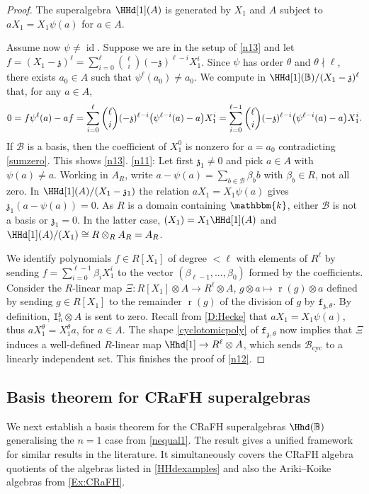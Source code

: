 \documentclass[a4paper,11pt]{amsart}
\newcommand\cB{\mathcal{B}}
\numberwithin{equation}{subsection}
\theoremstyle{definition}
\theoremstyle{theorem}
\theoremstyle{remark}
\newcommand\charge{{\mathfrak{z}}}
\newcommand\kapp{{\mathfrak{z}}}
\newcommand\Ic[1][n]{\mathtt{I}^\charge_{#1}}
\newcommand\fct{\mathtt{f}_{\charge,\theta}}
\newcommand\op{\operatorname}
\newcommand\kk{\mathbbm{k}}
\newcommand\RR{R}
\newcommand{\Bo}{\mathbb{B}}
\begin{document}
\begin{proof} The superalgebra $\HHd[1](A)$ is generated by $X_1$ and $A$ subject to $aX_1=X_1\psi(a)$ for $a\in A$.

Assume now $\psi\not=\op{id}$. Suppose we are in the setup of
\autoref{n13} and let $f=(X_1-\kapp)^\ell=\sum_{i=0}^{\ell}
  \binom{\ell}{i}(-\kapp)^{\ell-i}X_1^i$.  Since $\psi$ has order $\theta$ and $\theta\nmid\ell$, there exists $a_0\in A$ such
that $\psi^\ell(a_0)\neq a_0$. We compute in $\HHd[1](\Bo)/(X_1-\kapp)^\ell$ that, for any $a\in A$,
  \begin{equation}\label{sumzero}
  0=f\psi^\ell(a)-af
 =
 \sum_{i=0}^{\ell}
 \binom{\ell}{i}(-\kapp)^{\ell-i}
 \bigl(\psi^{\ell-i}(a)-a\bigr)X_1^i  \\
 =
 \sum_{i=0}^{\ell-1}
 \binom{\ell}{i}(-\kapp)^{\ell-i}
 \bigl(\psi^{\ell-i}(a)-a\bigr)X_1^i.
\end{equation}
If  $\cB$ is a basis, then the coefficient of $X_1^0$ is nonzero for  $a=a_0$ contradicting \autoref{sumzero}.
This shows  \autoref{n13}.
\autoref{n11}: Let first  $\kapp_1\neq0$ and pick $a\in A$ with $\psi(a)\neq a$. Working in $A_\RR$, write $a-\psi(a)=\sum_{b\in\cB}\beta_bb$ with $\beta_b\in\RR$, not all zero. In $\HHd[1](A)/(X_1-\kapp_1)$ the relation $aX_1=X_1\psi(a)$ gives $\kapp_1(a-\psi(a))=0$.  As $\RR$ is a domain containing $\kk$, either $\cB$ is not a basis or  $\kapp_1=0$. In the latter case,  $(X_1)=X_1\HHd[1](A)$ and $\HHd[1](A)/(X_1)\cong\RR\otimes_\RR A_\RR=A_\RR$.

 We identify polynomials $f\in R[X_1]$ of degree $<\ell$  with elements
of  $R^\ell$ by sending $f=\sum_{i=0}^{\ell-1}\beta_iX_1^i$ to the
vector $(\beta_{\ell-1},\ldots, \beta_0)$  formed by the coefficients.
Consider the $R$-linear map $\Xi\colon R[X_1]\otimes A\to
R^\ell\otimes A$, $g\otimes a\mapsto \op{r}(g)\otimes a$ defined by
sending  $g\in R[X_1]$ to the remainder $\op{r}(g)$ of the division of
$g$ by  $\fct$.  By definition,  $\Ic\otimes A$ is sent to zero.  Recall from
\autoref{D:Hecke} that $a X_1 =X_1
\psi(a)$, thus $a X_1^\theta =X_1^\theta a$, for $a\in A$. The shape \autoref{cyclotomicpoly} of $\fct$ now implies that $\Xi$ induces a well-defined $R$-linear map
 $\Hhd[1]\to R^\ell\otimes A$, which sends $\cB_{\op{cyc}}$ to a linearly independent set.  This finishes the proof of \autoref{n12}.
\end{proof}

 \subsection{Basis theorem for CRaFH superalgebras}
We next establish a basis theorem for the CRaFH superalgebras $\Hhd(\Bo)$
generalising the $n=1$ case from \autoref{nequal1}. The result gives  a unified framework for
similar results in the literature. It simultaneously covers the CRaFH
algebra quotients of the algebras listed in \autoref{HHdexamples} and also the Ariki--Koike algebras from \autoref{Ex:CRaFH}.
\end{document}

